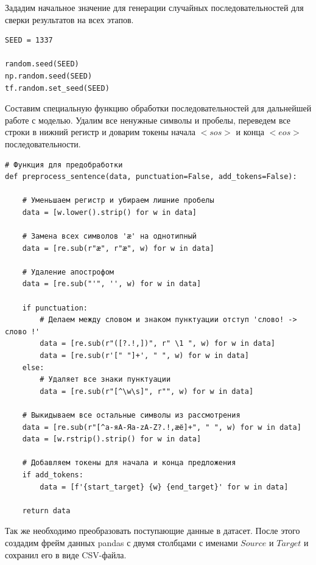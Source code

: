     Зададим начальное значение для генерации случайных последовательностей для сверки результатов на всех этапов.
    
\begin{lstlisting}[language=iPython] 
SEED = 1337

random.seed(SEED)
np.random.seed(SEED)
tf.random.set_seed(SEED) \end{lstlisting}
	
	Составим специальную функцию обработки последовательностей для дальнейшей работе с моделью. Удалим все ненужные символы и пробелы, переведем все строки в нижний регистр и доварим токены начала $<sos>$ и конца $<eos>$ последовательности.

\begin{lstlisting}[language=iPython]
# Функция для предобработки 
def preprocess_sentence(data, punctuation=False, add_tokens=False):
    
    # Уменьшаем регистр и убираем лишние пробелы
    data = [w.lower().strip() for w in data]
    
    # Замена всех символов 'æ' на однотипный
    data = [re.sub(r"ӕ", r"æ", w) for w in data]
    
    # Удаление апострофом
    data = [re.sub("'", '', w) for w in data]
    
    if punctuation:
        # Делаем между словом и знаком пунктуации отступ 'слово! -> слово !'
        data = [re.sub(r"([?.!,])", r" \1 ", w) for w in data]
        data = [re.sub(r'[" "]+', " ", w) for w in data]
    else:
        # Удаляет все знаки пунктуации
        data = [re.sub(r"[^\w\s]", r"", w) for w in data]
    
    # Выкидываем все остальные символы из рассмотрения 
    data = [re.sub(r"[^a-яА-Яa-zA-Z?.!,æё]+", " ", w) for w in data]
    data = [w.rstrip().strip() for w in data]
    
    # Добавляем токены для начала и конца предложения
    if add_tokens:
        data = [f'{start_target} {w} {end_target}' for w in data]
        
    return data \end{lstlisting}
	
	Так же необходимо преобразовать поступающие данные в датасет. После этого создадим фрейм данных pandas с двумя столбцами с именами $Source$ и $Target$ и сохранил его в виде CSV-файла.
	
